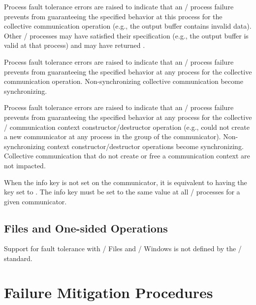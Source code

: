 \begin{description}
\item {} Process fault tolerance errors are raised to indicate that an \MPI/ process failure prevents from guaranteeing the specified behavior at this process for the collective communication operation (e.g., the output buffer contains invalid data). Other \MPI/ processes may have satisfied their specification (e.g., the output buffer is valid at that process) and may have returned .
\item {} Process fault tolerance errors are raised to indicate that an \MPI/ process failure prevents from guaranteeing the specified behavior at any process for the collective communication operation. Non-synchronizing collective communication become synchronizing.
\item {} Process fault tolerance errors are raised to indicate that an \MPI/ process failure prevents from guaranteeing the specified behavior at any process for the collective \MPI/ communication context constructor/destructor operation (e.g.,  could not create a new communicator at any process in the group of the communicator). Non-synchronizing context constructor/destructor operations become synchronizing. Collective communication that do not create or free a communication context are not impacted. %
\end{description}

When the info key  is not set on the communicator, it is equivalent to having the key set to .
The info key  must be set to the same value at all \MPI/ processes
for a given communicator.

\subsection{Files and One-sided Operations}
\label{sec:ft-notification:file-rma}

\begin{users}
    Support for fault tolerance with \MPI/ Files and \RMA/ Windows is not
    defined by the \MPI/ standard.
\end{users}

\section{Failure Mitigation Procedures}
\label{sec:ft-functions}

